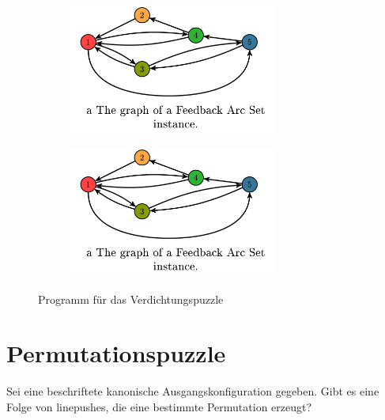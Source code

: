 \documentclass[seminar,german]{algothesis}
\begin{document}
\begin{figure}
	\centering
	\begin{subfigure}{.5\textwidth}
		\includegraphics[width=0.75\textwidth]{graph}
    \end{subfigure}%
    \begin{subfigure}{.5\textwidth}
		\includegraphics[width=0.75\textwidth]{graph}
    \end{subfigure}
    \caption{Programm für das Verdichtungspuzzle}
	\label{fig:6}
\end{figure}

\newpage

\section{Permutationspuzzle}
Sei eine beschriftete kanonische Ausgangskonfiguration gegeben. Gibt es eine Folge von linepushes, die eine bestimmte Permutation erzeugt? 
\end{document}
